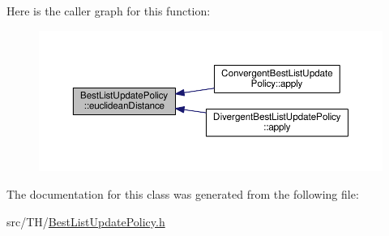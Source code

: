 Here is the caller graph for this function\+:
\nopagebreak
\begin{figure}[H]
\begin{center}
\leavevmode
\includegraphics[width=350pt]{classBestListUpdatePolicy_a6987f90d6d9e5fec813f5aa53fe47ce3_icgraph}
\end{center}
\end{figure}




The documentation for this class was generated from the following file\+:\begin{DoxyCompactItemize}
\item 
src/\+T\+H/\hyperlink{BestListUpdatePolicy_8h}{Best\+List\+Update\+Policy.\+h}\end{DoxyCompactItemize}
